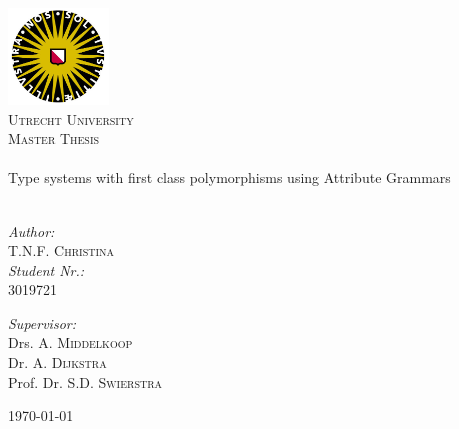 \begin{titlepage}
 
\begin{center}
 

 \includegraphics[width=0.20\textwidth]{./uu_logo}\\[1cm] 

\textsc{\LARGE Utrecht University}\\[1.5cm]
 
\textsc{\Large Master Thesis}\\[0.5cm]
 

 \HRule \\[0.4cm]
 { \huge  Type systems with first class polymorphisms using Attribute Grammars}\\[0.4cm]
 
\HRule \\[1.5cm]
 
 \begin{minipage}{0.4\textwidth}
 \begin{flushleft} \large
 \emph{Author:}\\
 T.N.F. \textsc{Christina} \\
 \emph{Student Nr.:} \\
 3019721
 \end{flushleft}
 \end{minipage}
 \begin{minipage}{0.5\textwidth}
 \begin{flushright} \large
 \emph{Supervisor:} \\
 Drs. A. \textsc{Middelkoop} \\
 Dr. A. \textsc{Dijkstra} \\
 Prof. Dr. S.D. \textsc{Swierstra}
 \end{flushright}
 \end{minipage}
 
\vfill
\vfill
 
 {\large \today}
 
\end{center}
 
\end{titlepage}
